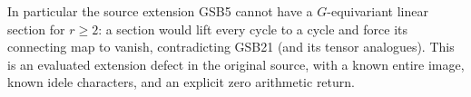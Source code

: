 In particular the source extension GSB5 cannot have a
$G$-equivariant linear section for $r\ge2$: a section would lift
every cycle to a cycle and force its connecting map to vanish,
contradicting GSB21 (and its tensor analogues). This is an evaluated
extension defect in the original source, with a known entire image,
known idele characters, and an explicit zero arithmetic return.


